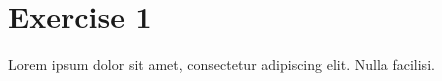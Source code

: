 \documentclass[12pt]{article}
\begin{document}

\section*{Exercise 1}

Lorem ipsum dolor sit amet, consectetur adipiscing elit. Nulla facilisi.
\end{document}
